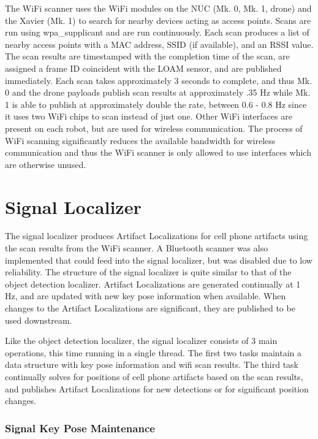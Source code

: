 The WiFi scanner uses the WiFi modules on the NUC (Mk. 0, Mk. 1, drone) and the Xavier (Mk. 1) to search for nearby devices acting as access points. Scans are run using wpa\_supplicant and are run continuously. Each scan produces a list of nearby access points with a MAC address, SSID (if available), and an RSSI value. The scan results are timestamped with the completion time of the scan, are assigned a frame ID coincident with the LOAM sensor, and are published immediately. Each scan takes approximately 3 seconds to complete, and thus Mk. 0 and the drone payloads publish scan results at approximately .35 Hz while Mk. 1 is able to publish at approximately double the rate, between 0.6 - 0.8 Hz since it uses two WiFi chips to scan instead of just one. Other WiFi interfaces are present on each robot, but are used for wireless communication. The process of WiFi scanning significantly reduces the available bandwidth for wireless communication and thus the WiFi scanner is only allowed to use interfaces which are otherwise unused.

\section{Signal Localizer}

The signal localizer produces Artifact Localizations for cell phone artifacts using the scan results from the WiFi scanner. A Bluetooth scanner was also implemented that could feed into the signal localizer, but was disabled due to low reliability. The structure of the signal localizer is quite similar to that of the object detection localizer. Artifact Localizations are generated continually at 1 Hz, and are updated with new key pose information when available. When changes to the Artifact Localizations are significant, they are published to be used downstream.

Like the object detection localizer, the signal localizer consists of 3 main operations, this time running in a single thread. The first two tasks maintain a data structure with key pose information and wifi scan results. The third task continually solves for positions of cell phone artifacts based on the scan results, and publishes Artifact Localizations for new detections or for significant position changes.

\subsubsection{Signal Key Pose Maintenance}

